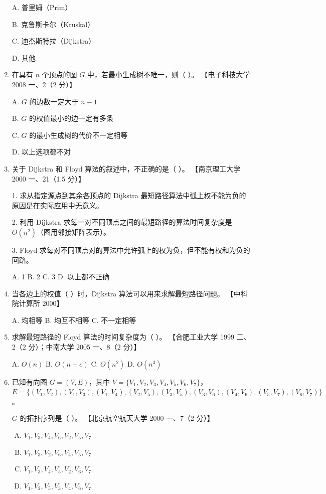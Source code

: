 \documentclass[lang=cn,newtx,10pt,scheme=chinese]{elegantbook}
\begin{document}
\begin{enumerate}
        A. 普里姆（Prim）  

        B. 克鲁斯卡尔（Kruskal）  

        C. 迪杰斯特拉（Dijkstra）  

        D. 其他  
    
        \item 在具有 $n$ 个顶点的图 $G$ 中，若最小生成树不唯一，则（ ）。  
        【电子科技大学 2008 一、2（2 分）】 

        A. $G$ 的边数一定大于 $n-1$  

        B. $G$ 的权值最小的边一定有多条  

        C. $G$ 的最小生成树的代价不一定相等  

        D. 以上选项都不对  

        \item 关于 Dijkstra 和 Floyd 算法的叙述中，不正确的是（ ）。  
    【南京理工大学 2000 一、21（1.5 分）】  

    1. 求从指定源点到其余各顶点的 Dijkstra 最短路径算法中弧上权不能为负的原因是在实际应用中无意义。  

    2. 利用 Dijkstra 求每一对不同顶点之间的最短路径的算法时间复杂度是 $O(n^2)$（图用邻接矩阵表示）。

    3. Floyd 求每对不同顶点对的算法中允许弧上的权为负，但不能有权和为负的回路。  

    A. 1 \quad B. 2 \quad C. 3 \quad D. 以上都不正确  

    \item 当各边上的权值（ ）时，Dijkstra 算法可以用来求解最短路径问题。  
    【中科院计算所 2000】  

    A. 均相等 \quad B. 均互不相等 \quad C. 不一定相等  

    \item 求解最短路径的 Floyd 算法的时间复杂度为（ ）。  
    【合肥工业大学 1999 二、2（2 分）；中南大学 2005 一、8（2 分）】  

    A. $O(n)$ \quad B. $O(n+e)$ \quad C. $O(n^2)$ \quad D. $O(n^3)$  

    \item 已知有向图 $G = (V, E)$，其中  
    $V = \{V_1, V_2, V_3, V_4, V_5, V_6, V_7\}$，  
    $E = \{( V_1, V_2) ,  (V_1, V_3) ,  (V_1, V_4) ,  (V_2, V_5) ,  
    (V_3, V_5 ),  (V_3, V_6) ,  (V_4, V_6),  (V_5, V_7),  (V_6, V_7) \}$。  

    $G$ 的拓扑序列是（ ）。  
    【北京航空航天大学 2000 一、7（2 分）】  

    \begin{enumerate}[A.]
        \item $V_1, V_3, V_4, V_6, V_2, V_5, V_7$
        \item $V_1, V_3, V_2, V_6, V_4, V_5, V_7$
        \item $V_1, V_3, V_4, V_5, V_2, V_6, V_7$
        \item $V_1, V_2, V_5, V_3, V_4, V_6, V_7$
    \end{enumerate}


\end{enumerate}
\end{document}
